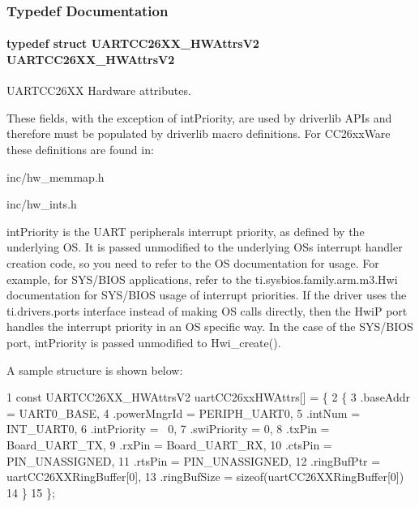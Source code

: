 \subsubsection{Typedef Documentation}
\paragraph[{U\+A\+R\+T\+C\+C26\+X\+X\+\_\+\+H\+W\+Attrs\+V2}]{\setlength{\rightskip}{0pt plus 5cm}typedef struct {\bf U\+A\+R\+T\+C\+C26\+X\+X\+\_\+\+H\+W\+Attrs\+V2}  {\bf U\+A\+R\+T\+C\+C26\+X\+X\+\_\+\+H\+W\+Attrs\+V2}}\label{_u_a_r_t_c_c26_x_x_8h_a8fdb76e26490beca00f33d3f918ce0dc}


U\+A\+R\+T\+C\+C26\+X\+X Hardware attributes. 

These fields, with the exception of int\+Priority, are used by driverlib A\+P\+Is and therefore must be populated by driverlib macro definitions. For C\+C26xx\+Ware these definitions are found in\+:
\begin{DoxyItemize}
\item inc/hw\+\_\+memmap.\+h
\item inc/hw\+\_\+ints.\+h
\end{DoxyItemize}

int\+Priority is the U\+A\+R\+T peripheral\textquotesingle{}s interrupt priority, as defined by the underlying O\+S. It is passed unmodified to the underlying O\+S\textquotesingle{}s interrupt handler creation code, so you need to refer to the O\+S documentation for usage. For example, for S\+Y\+S/\+B\+I\+O\+S applications, refer to the ti.\+sysbios.\+family.\+arm.\+m3.\+Hwi documentation for S\+Y\+S/\+B\+I\+O\+S usage of interrupt priorities. If the driver uses the ti.\+drivers.\+ports interface instead of making O\+S calls directly, then the Hwi\+P port handles the interrupt priority in an O\+S specific way. In the case of the S\+Y\+S/\+B\+I\+O\+S port, int\+Priority is passed unmodified to Hwi\+\_\+create().

A sample structure is shown below\+: 
\begin{DoxyCode}
1 const UARTCC26XX\_HWAttrsV2 uartCC26xxHWAttrs[] = \{
2     \{
3         .baseAddr    = UART0\_BASE,
4         .powerMngrId = PERIPH\_UART0,
5         .intNum      = INT\_UART0,
6         .intPriority = ~0,
7         .swiPriority = 0,
8         .txPin       = Board\_UART\_TX,
9         .rxPin       = Board\_UART\_RX,
10         .ctsPin      = PIN\_UNASSIGNED,
11         .rtsPin      = PIN\_UNASSIGNED,
12         .ringBufPtr  = uartCC26XXRingBuffer[0],
13         .ringBufSize = sizeof(uartCC26XXRingBuffer[0])
14     \}
15 \};
\end{DoxyCode}


